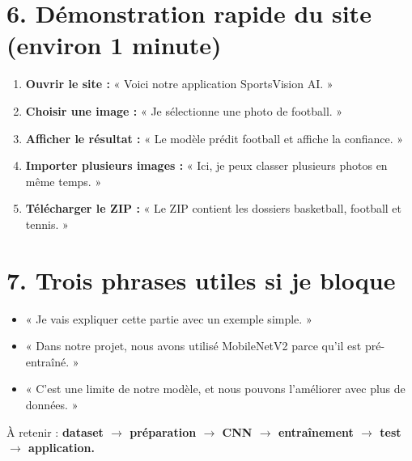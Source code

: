 \documentclass[10pt,a4paper]{article}
\begin{document}
\section{6. Démonstration rapide du site (environ 1 minute)}
\begin{enumerate}[leftmargin=*,itemsep=2pt,topsep=2pt]
\item \textbf{Ouvrir le site :} « Voici notre application SportsVision AI. »
\item \textbf{Choisir une image :} « Je sélectionne une photo de football. »
\item \textbf{Afficher le résultat :} « Le modèle prédit football et affiche la confiance. »
\item \textbf{Importer plusieurs images :} « Ici, je peux classer plusieurs photos en même temps. »
\item \textbf{Télécharger le ZIP :} « Le ZIP contient les dossiers basketball, football et tennis. »
\end{enumerate}

\section{7. Trois phrases utiles si je bloque}
\begin{itemize}[leftmargin=*,itemsep=1pt,topsep=1pt]
\item « Je vais expliquer cette partie avec un exemple simple. »
\item « Dans notre projet, nous avons utilisé MobileNetV2 parce qu'il est pré-entraîné. »
\item « C'est une limite de notre modèle, et nous pouvons l'améliorer avec plus de données. »
\end{itemize}
\begin{center}
\small\color{gris} À retenir : \textbf{dataset $\rightarrow$ préparation $\rightarrow$ CNN $\rightarrow$ entraînement $\rightarrow$ test $\rightarrow$ application.}
\end{center}
\end{document}
